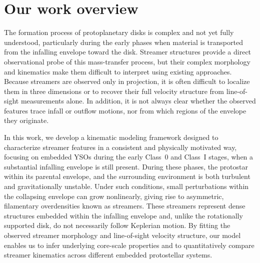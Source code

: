 \section{Our work overview}

The formation process of protoplanetary disks is complex and not yet fully understood, particularly during the early phases when material is transported from the infalling envelope toward the disk. Streamer structures provide a direct observational probe of this mass-transfer process, but their complex morphology and kinematics make them difficult to interpret using existing approaches. Because streamers are observed only in projection, it is often difficult to localize them in three dimensions or to recover their full velocity structure from line-of-sight measurements alone. In addition, it is not always clear whether the observed features trace infall or outflow motions, nor from which regions of the envelope they originate.

In this work, we develop a kinematic modeling framework designed to characterize streamer features in a consistent and physically motivated way, focusing on embedded YSOs during the early Class~0 and Class~I stages, when a substantial infalling envelope is still present. During these phases, the protostar within its parental envelope, and the surrounding environment is both turbulent and gravitationally unstable. Under such conditions, small perturbations within the collapsing envelope can grow nonlinearly, giving rise to asymmetric, filamentary overdensities known as streamers. These streamers represent dense structures embedded within the infalling envelope and, unlike the rotationally supported disk, do not necessarily follow Keplerian motion. By fitting the observed streamer morphology and line-of-sight velocity structure, our model enables us to infer underlying core-scale properties and to quantitatively compare streamer kinematics across different embedded protostellar systems.
